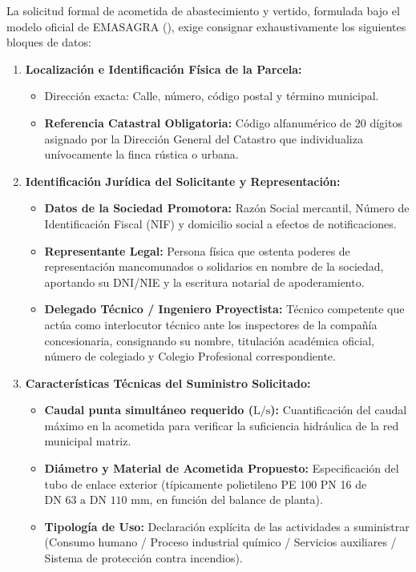 \documentclass{report}
\begin{document}
La solicitud formal de acometida de abastecimiento y vertido, formulada bajo el modelo oficial de EMASAGRA (\cite{EMASAGRA2026}), exige consignar exhaustivamente los siguientes bloques de datos:

\begin{enumerate}
    \item \textbf{Localización e Identificación Física de la Parcela:}
          \begin{itemize}
              \item Dirección exacta: Calle, número, código postal y término municipal.
              \item \textbf{Referencia Catastral Obligatoria:} Código alfanumérico de 20 dígitos asignado por la Dirección General del Catastro que individualiza unívocamente la finca rústica o urbana.
          \end{itemize}

    \item \textbf{Identificación Jurídica del Solicitante y Representación:}
          \begin{itemize}
              \item \textbf{Datos de la Sociedad Promotora:} Razón Social mercantil, Número de Identificación Fiscal (NIF) y domicilio social a efectos de notificaciones.
              \item \textbf{Representante Legal:} Persona física que ostenta poderes de representación mancomunados o solidarios en nombre de la sociedad, aportando su DNI/NIE y la escritura notarial de apoderamiento.
              \item \textbf{Delegado Técnico / Ingeniero Proyectista:} Técnico competente que actúa como interlocutor técnico ante los inspectores de la compañía concesionaria, consignando su nombre, titulación académica oficial, número de colegiado y Colegio Profesional correspondiente.
          \end{itemize}

    \item \textbf{Características Técnicas del Suministro Solicitado:}
          \begin{itemize}
              \item \textbf{Caudal punta simultáneo requerido ($\text{L/s}$):} Cuantificación del caudal máximo en la acometida para verificar la suficiencia hidráulica de la red municipal matriz.
              \item \textbf{Diámetro y Material de Acometida Propuesto:} Especificación del tubo de enlace exterior (típicamente polietileno PE 100 PN 16 de $\text{DN }63\text{ a }\text{DN }110\text{ mm}$, en función del balance de planta).
              \item \textbf{Tipología de Uso:} Declaración explícita de las actividades a suministrar (Consumo humano / Proceso industrial químico / Servicios auxiliares / Sistema de protección contra incendios).
          \end{itemize}


\end{enumerate}
\end{document}

